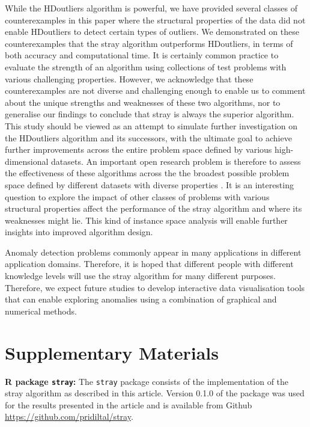 \documentclass[11pt,a4paper,]{article}
\theoremstyle{definition}
\theoremstyle{definition}
\theoremstyle{definition}
\theoremstyle{remark}
\begin{document}
While the HDoutliers algorithm is powerful, we have provided several classes of counterexamples in this paper where the structural properties of the data did not enable HDoutliers to detect certain types of outliers. We demonstrated on these counterexamples that the stray algorithm outperforms HDoutliers, in terms of both accuracy and computational time. It is certainly common practice to evaluate the strength of an algorithm using collections of test problems with various challenging properties. However, we acknowledge that these counterexamples are not diverse and challenging enough to enable us to comment about the unique strengths and weaknesses of these two algorithms, nor to generalise our findings to conclude that stray is always the superior algorithm. This study should be viewed as an attempt to simulate further investigation on the HDoutliers algorithm and its successors, with the ultimate goal to achieve further improvements across the entire problem space defined by various high-dimensional datasets. An important open research problem is therefore to assess the effectiveness of these algorithms across the the broadest possible problem space defined by different datasets with diverse properties \autocite{kang2017visualising}. It is an interesting question to explore the impact of other classes of problems with various structural properties affect the performance of the stray algorithm and where its weaknesses might lie. This kind of instance space analysis \autocite{smith2014towards} will enable further insights into improved algorithm design.

Anomaly detection problems commonly appear in many applications in different application domains. Therefore, it is hoped that different people with different knowledge levels will use the stray algorithm for many different purposes. Therefore, we expect future studies to develop interactive data visualisation tools that can enable exploring anomalies using a combination of graphical and numerical methods.

\hypertarget{supplementary-materials}{%
\section*{Supplementary Materials}\label{supplementary-materials}}

\textbf{R package \texttt{stray}:} The \texttt{stray} package \autocite{strayR2019} consists of the implementation of the stray algorithm as described in this article. Version 0.1.0 of the package was used for the results presented in the article and is available from Github \url{https://github.com/pridiltal/stray}.
\end{document}
